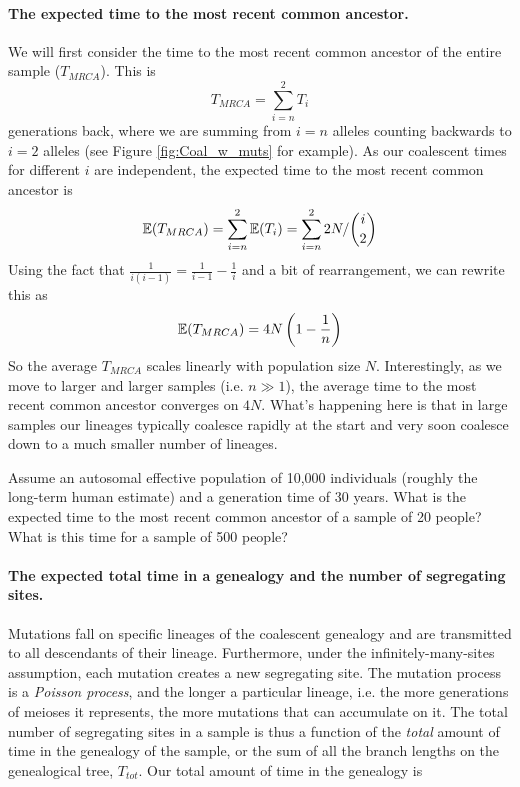 \paragraph{The expected time to the most recent common ancestor.}
We will first consider the time to the most recent common ancestor of
the entire sample ($T_{MRCA}$). This is
\begin{equation}
T_{MRCA} = \sum_{i=n}^2 T_i
\end{equation}
generations back, where we are summing from $i=n$ alleles counting backwards to $i=2$ alleles (see Figure \ref{fig:Coal_w_muts} for example). As our coalescent times for different $i$ are independent, the expected time to the most recent common ancestor
is
\begin{equation}
\mathbb{E}(T_{MRCA}) = \sum_{i=n}^2 \mathbb{E}(T_i) = \sum_{i=n}^2  2N/{i \choose
 2}
\end{equation}
Using the fact that $\frac{1}{i(i-1)}=\frac{1}{i-1} - \frac{1}{i}$ and a bit of
rearrangement, we can rewrite this as
\begin{equation}
\mathbb{E}(T_{MRCA}) = 4N\left(1- \frac{1}{n} \right) \label{TMRCA_neutral}
\end{equation}
So the average $T_{MRCA}$ scales linearly with population
size $N$. Interestingly, as we move to larger and larger samples (i.e. $n \gg 1$), the average
time to the most recent common ancestor converges on $4N$. What's
happening here is that in large samples our lineages typically coalesce rapidly
at the start and very soon coalesce down to a much smaller number of
lineages.   \\

\begin{question}
Assume an autosomal effective population of 10,000 individuals (roughly the long-term human estimate) and a generation time of 30 years. What is the expected time to the most recent common ancestor of a sample of 20 people? What is this time for a sample of 500 people?
\end{question}
\paragraph{The expected total time in a genealogy and the number of
  segregating sites.}

Mutations fall on specific lineages of the coalescent genealogy and are transmitted to all descendants of their lineage. Furthermore, under the infinitely-many-sites assumption, each mutation creates a new segregating site. The mutation process is a
\emph{Poisson process}, and the longer a particular lineage, i.e. the more generations of meioses it represents, the more
mutations that can accumulate on it. The total number of segregating sites in
a sample is thus a function of the \emph{total} amount of time in the
genealogy of the sample, or the sum of all the branch lengths on the genealogical tree,
$T_{tot}$. Our total amount of time in the genealogy is

